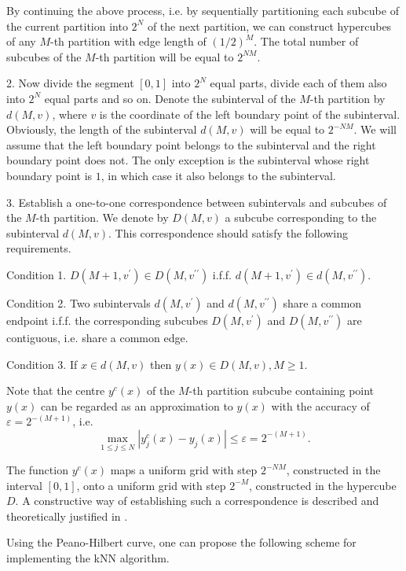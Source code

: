 \documentclass[entropy,article,submit,moreauthors,pdftex]{Definitions/mdpi}
\begin{document}
By continuing the above process, i.e. by sequentially partitioning each subcube of the current partition into $2^N$ of the next partition, we can construct hypercubes of any $M$-th partition with edge length of $(1/2)^M$. The total number of subcubes of the $M$-th partition will be equal to $2^{NM}$.

2. Now divide the segment $[0, 1]$ into $2^N$ equal parts, divide  each of them also into $2^N$ equal parts and so on. Denote the subinterval of the $M$-th partition by $d(M,v)$, where $v$ is the coordinate of the left boundary point of the subinterval. Obviously, the length of the subinterval $d(M,v)$ will be equal to $2^{-NM}$. We will assume that the left boundary point belongs to the subinterval and the right boundary point does not. The only exception is the subinterval whose right boundary point is $1$, in which case it also belongs to the subinterval.

3. Establish a one-to-one correspondence between subintervals and subcubes of the $M$-th partition. We denote by $D(M,v)$ a subcube corresponding to the subinterval $d(M,v)$. This correspondence should satisfy the following requirements.

Condition 1. $D(M+1,v^\prime) \in D(M,v^{\prime\prime})$ i.f.f. $d(M+1,v^\prime) \in d(M,v^{\prime\prime})$.

Condition 2. Two subintervals $d(M,v^\prime)$ and $d(M,v^{\prime\prime})$ share a common endpoint i.f.f. the corresponding subcubes $D(M,v^\prime)$ and $D(M,v^{\prime\prime})$  are  contiguous, i.e. share a common edge.

Condition 3.  If $x \in d(M,v)$ then $y(x) \in D(M,v), M \geq 1$.  

Note that the centre  $y^c(x)$ of the $M$-th partition subcube containing point $y(x)$ can be regarded as an approximation to $y(x)$ with the accuracy of $\varepsilon = 2^{-(M+1)}$, i.e.
\begin{equation}
\max_{1 \leq j \leq N} \left| y_j^c(x)-y_j(x) \right| \leq \varepsilon = 2^{-(M+1)}.
\end{equation} 

The function $y^c(x)$ maps a uniform grid with step $2^{-NM}$, constructed in the interval $[0,1]$, onto a uniform grid with step $2^{-M}$, constructed in the hypercube $D$. A constructive way of establishing such a correspondence is described and theoretically justified in \cite{Strongin2000, Sergeyev2013}.

Using the Peano-Hilbert curve, one can propose the following scheme for implementing the kNN algorithm.
\end{document}
